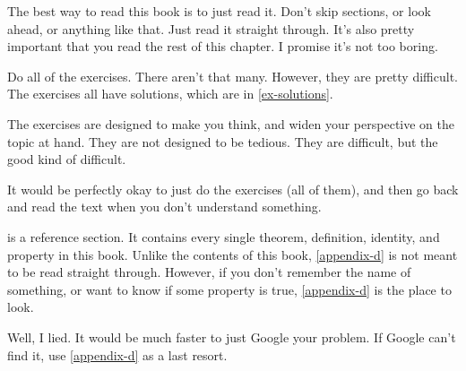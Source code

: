 
The best way to read this book is to just read it. Don't skip sections,
or look ahead, or anything like that. Just read it straight
through. It's also pretty important that you read the rest of this
chapter. I promise it's not too boring.

Do all of the exercises. There aren't that many. However, they are
pretty difficult. The exercises all have solutions, which are in
\cref{ex-solutions}.

The exercises are designed to make you think, and widen your perspective
on the topic at hand. They are not designed to be tedious. They are
difficult, but the good kind of difficult.

It would be perfectly okay to just do the exercises (all of them), and
then go back and read the text when you don't understand something.

 is a reference section. It contains every single
theorem, definition, identity, and property in this book. Unlike the
contents of this book, \cref{appendix-d} is not meant to be read
straight through. However, if you don't remember the name of something,
or want to know if some property is true, \cref{appendix-d} is the place
to look.

Well, I lied. It would be much faster to just Google your problem. If Google
can't find it, use \cref{appendix-d} as a last resort.